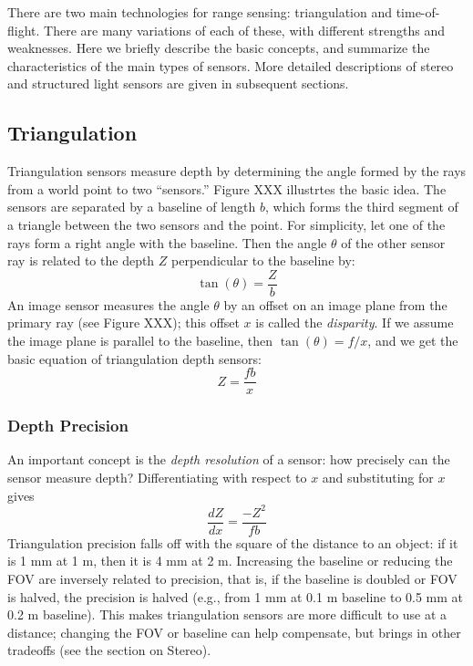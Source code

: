 \documentclass[twocolumn,oneside]{book}
\begin{document}
There are two main technologies for range sensing: triangulation and
time-of-flight.  There are many variations of each of these, with
different strengths and weaknesses.  Here we briefly describe the
basic concepts, and summarize the characteristics of the main types of
sensors.  More detailed descriptions of stereo and structured light
sensors are given in subsequent sections.

\subsection{Triangulation}

Triangulation sensors measure depth by determining the angle formed by
the rays from a world point to two ``sensors.''  Figure XXX illustrtes
the basic idea.  The sensors are separated by a baseline of length
$b$, which forms the third segment of a triangle between the two
sensors and the point.  For simplicity, let one of the rays form a
right angle with the baseline.  Then the angle $\theta$ of the other
sensor ray is related to the depth $Z$ perpendicular to the baseline
by:
\begin{equation}
 \tan(\theta) = \frac{Z}{b}
\label{eq31.angle-range}
\end{equation}
An image sensor measures the angle $\theta$ by an offset on an
image plane from the primary ray (see Figure XXX); this offset $x$ is
called the {\em disparity}.  If we assume the image plane is parallel
to the baseline, then $\tan(\theta) = f/x$, and we get the basic
equation of triangulation depth sensors:
\begin{equation}
 Z = \frac{fb}{x}
\label{eq31.disparity}
\end{equation}

\subsubsection{Depth Precision} 

An important concept is the {\em depth resolution} of a sensor: how
precisely can the sensor measure depth?  Differentiating with respect
to $x$ and substituting for $x$ gives 
\begin{equation}
 \frac{dZ}{dx} = \frac{-Z^2}{fb}
\label{eq31.disparity-resolution}
\end{equation}
Triangulation precision falls off with the square of the distance to
an object: if it is 1 mm at 1 m, then it is 4 mm at 2 m.  Increasing
the baseline or reducing the FOV are inversely related to precision,
that is, if the baseline is doubled or FOV is halved, the precision is
halved (e.g., from 1 mm at 0.1 m baseline to 0.5 mm at 0.2 m
baseline).  This makes triangulation sensors are more difficult to use
at a distance; changing the FOV or baseline can help compensate, but
brings in other tradeoffs (see the section on Stereo).
\end{document}
